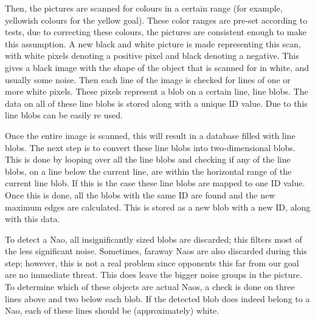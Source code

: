 \documentclass[11pt,a4paper,oneside]{article}
\begin{document}
Then, the pictures are scanned for colours in a certain range (for example, yellowish colours for the yellow goal). These color ranges are pre-set according to tests, due to correcting these colours, the pictures are consistent enough to make this assumption. A new black and white picture is made representing this scan, with white pixels denoting a positive pixel and black denoting a negative. This gives a black image with the shape of the object that is scanned for in white, and usually some noise. Then each line of the image is checked for lines of one or more white pixels. These pixels represent a blob on a certain line, line blobs. The data on all of these line blobs is stored along with a unique ID value. Due to this line blobs can be easily re used.

Once the entire image is scanned, this will result in a database filled with line blobs. The next step is to convert these line blobs into two-dimensional blobs. This is done by looping over all the line blobs and checking if any of the line blobs, on a line below the current line, are within the horizontal range of the current line blob. If this is the case these line blobs are mapped to one ID value. Once this is done, all the blobs with the same ID are found and the new maximum edges are calculated. This is stored as a new blob with a new ID, along with this data.

To detect a Nao, all insignificantly sized blobs are discarded; this filters most of the less significant noise. Sometimes, faraway Naos are also discarded during this step; however, this is not a real problem since opponents this far from our goal are no immediate threat. This does leave the bigger noise groups in the picture. To determine which of these objects are actual Naos, a check is done on three lines above and two below each blob. If the detected blob does indeed belong to a Nao, each of these lines should be (approximately) white.
\end{document}
